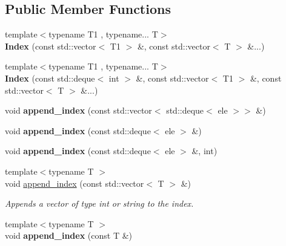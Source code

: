 \subsection*{Public Member Functions}
\begin{DoxyCompactItemize}
\item 
\mbox{\label{classIndex_a35f4948aa1ed7b87dc285cd56a64d24c}} 
{\footnotesize template$<$typename T1 , typename... T$>$ }\\{\bfseries Index} (const std\+::vector$<$ T1 $>$ \&, const std\+::vector$<$ T $>$ \&...)
\item 
\mbox{\label{classIndex_adc750ff9ab90e7fac9d411d1ebea4c86}} 
{\footnotesize template$<$typename T1 , typename... T$>$ }\\{\bfseries Index} (const std\+::deque$<$ int $>$ \&, const std\+::vector$<$ T1 $>$ \&, const std\+::vector$<$ T $>$ \&...)
\item 
\mbox{\label{classIndex_ab7e3d65b24ab12baad98db7491b65c74}} 
void {\bfseries append\+\_\+index} (const std\+::vector$<$ std\+::deque$<$ ele $>$$>$ \&)
\item 
\mbox{\label{classIndex_a847fbc1e3793b8a56d6d28c57d6c48b7}} 
void {\bfseries append\+\_\+index} (const std\+::deque$<$ ele $>$ \&)
\item 
\mbox{\label{classIndex_a943238b23183e406b3aa087545c20d49}} 
void {\bfseries append\+\_\+index} (const std\+::deque$<$ ele $>$ \&, int)
\item 
\mbox{\label{classIndex_af2ba3a1d2da53657241e91ed79b0f3ff}} 
{\footnotesize template$<$typename T $>$ }\\void \hyperlink{classIndex_af2ba3a1d2da53657241e91ed79b0f3ff}{append\+\_\+index} (const std\+::vector$<$ T $>$ \&)
\begin{DoxyCompactList}\small\item\em Appends a vector of type int or string to the index. \end{DoxyCompactList}\item 
\mbox{\label{classIndex_a201753361d8aa61356949b2e3b4e795c}} 
{\footnotesize template$<$typename T $>$ }\\void {\bfseries append\+\_\+index} (const T \&)
$$
\end{DoxyCompactItemize}
